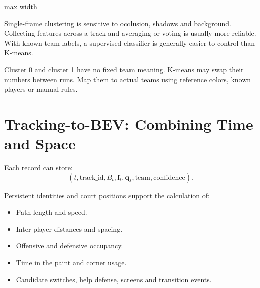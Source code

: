 \documentclass[11pt,a4paper,oneside]{report}
\begin{document}
\begin{center}
\begin{adjustbox}{max width=\linewidth}
\end{adjustbox}
\end{center}

Single-frame clustering is sensitive to occlusion, shadows and background. Collecting features across a track and averaging or voting is usually more reliable. With known team labels, a supervised classifier is generally easier to control than K-means.

\begin{riskBox}
Cluster 0 and cluster 1 have no fixed team meaning. K-means may swap their numbers between runs. Map them to actual teams using reference colors, known players or manual rules.
\end{riskBox}

\section{Tracking-to-BEV: Combining Time and Space}

Each record can store:
\[
(t,\mathrm{track\_id},B_t,\mathbf f_t,\mathbf q_t,\mathrm{team},\mathrm{confidence}).
\]

Persistent identities and court positions support the calculation of:

\begin{itemize}
  \item Path length and speed.
  \item Inter-player distances and spacing.
  \item Offensive and defensive occupancy.
  \item Time in the paint and corner usage.
  \item Candidate switches, help defense, screens and transition events.
\end{itemize}
\end{document}
